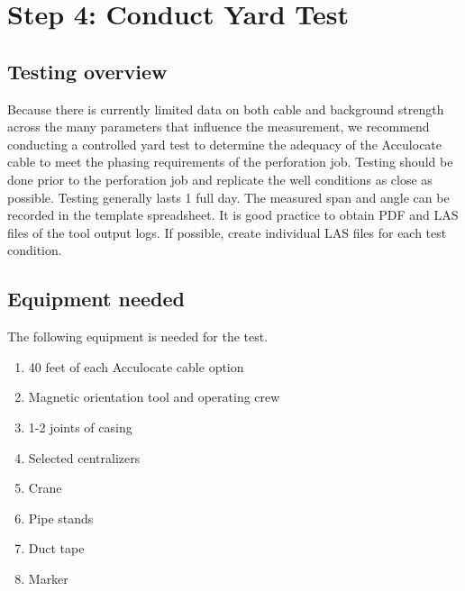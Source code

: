 \documentclass[paper=a4, fontsize=11pt]{scrartcl}
\numberwithin{equation}{section}		%
\numberwithin{figure}{section}			%
\numberwithin{table}{section}				%
\begin{document}
\section{Step 4: Conduct Yard Test}\label{section:step_4}

\subsection{Testing overview}
Because there is currently limited data on both cable and background strength across the many parameters that influence the measurement, we recommend conducting a controlled yard test to determine the adequacy of the Acculocate cable to meet the phasing requirements of the perforation job.  Testing should be done prior to the perforation job and replicate the well conditions as close as possible.  Testing generally lasts 1 full day.  The measured span and angle can be recorded in the template spreadsheet.  It is good practice to obtain PDF and LAS files of the tool output logs.  If possible, create individual LAS files for each test condition.  

\subsection{Equipment needed}
The following equipment is needed for the test.  

\begin{enumerate}
    \item 40 feet of each Acculocate cable option
    \item Magnetic orientation tool and operating crew
    \item 1-2 joints of casing
    \item Selected centralizers
    \item Crane
    \item Pipe stands
    \item Duct tape
    \item Marker
\end{enumerate}
\end{document}
